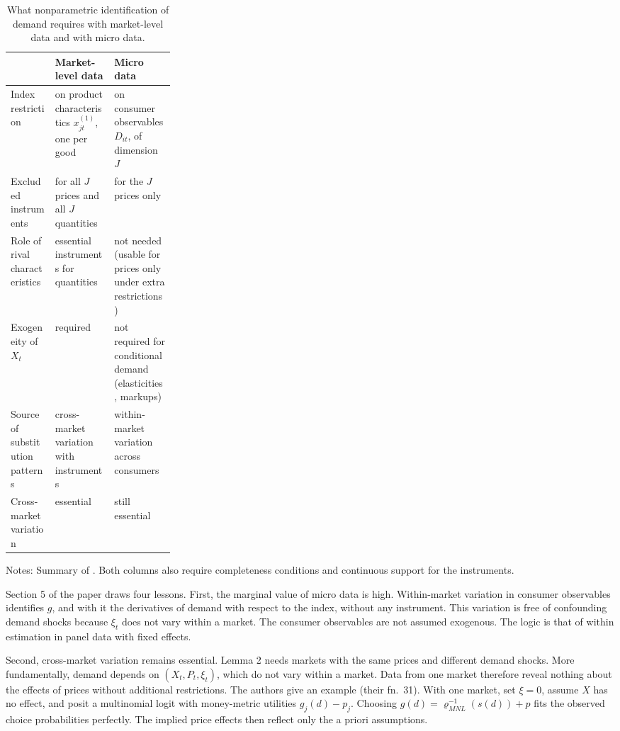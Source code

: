 \begin{table}[htbp]
\centering
\caption{What nonparametric identification of demand requires with market-level data and with micro data.}
\label{tab:08-bh-compare}
\footnotesize
\begin{tabularx}{\linewidth}{>{\raggedright\arraybackslash}p{0.27\linewidth}>{\raggedright\arraybackslash}X>{\raggedright\arraybackslash}X}
\toprule
 & Market-level data \citep{BerryHaile2014} & Micro data \citep{BerryHaile2024} \\
\midrule
Index restriction & on product characteristics $x^{(1)}_{jt}$, one per good & on consumer observables $D_{it}$, of dimension $J$ \\ \addlinespace[3pt]
Excluded instruments & for all $J$ prices and all $J$ quantities & for the $J$ prices only \\ \addlinespace[3pt]
Role of rival characteristics & essential instruments for quantities & not needed (usable for prices only under extra restrictions) \\ \addlinespace[3pt]
Exogeneity of $X_t$ & required & not required for conditional demand (elasticities, markups) \\ \addlinespace[3pt]
Source of substitution patterns & cross-market variation with instruments & within-market variation across consumers \\ \addlinespace[3pt]
Cross-market variation & essential & still essential \\
\bottomrule
\end{tabularx}
\par\smallskip
\parbox{\linewidth}{\footnotesize Notes: Summary of \citet[Sections~1, 4 and 5]{BerryHaile2024}. Both columns also
require completeness conditions and continuous support for the instruments.}
\end{table}

Section 5 of the paper draws four lessons. First, the marginal value of micro data is high. Within-market variation in
consumer observables identifies $g$, and with it the derivatives of demand with respect to the index, without any
instrument. This variation is free of confounding demand shocks because $\xi_t$ does not vary within a market. The
consumer observables are not assumed exogenous. The logic is that of within estimation in panel data with fixed
effects.

Second, cross-market variation remains essential. Lemma 2 needs markets with the same prices and different demand
shocks. More fundamentally, demand depends on $(X_t, P_t, \xi_t)$, which do not vary within a market. Data from one
market therefore reveal nothing about the effects of prices without additional restrictions. The authors give an
example (their fn.~31). With one market, set $\xi = 0$, assume $X$ has no effect, and posit a multinomial logit with
money-metric utilities $g_j(d) - p_j$. Choosing $g(d) = \varrho^{-1}_{MNL}(s(d)) + p$ fits the observed choice
probabilities perfectly. The implied price effects then reflect only the a priori assumptions.

